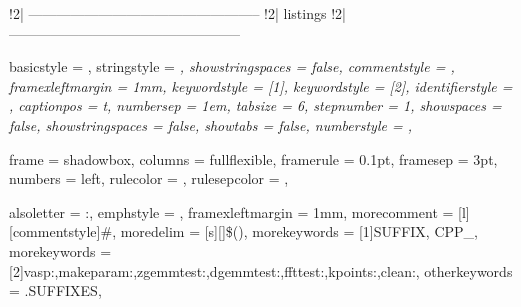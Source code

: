 !2| --------------------------------------------------
!2| {listings}
!2| --------------------------------------------------

\usepackage{listings} %

\newcommand{\mylstinputlisting}[2]{}


\newcommand{\RESERVEDCOMMANDSourceCodeIndexFontSize}{\scriptsize}

\lstset
{
	basicstyle = \RESERVEDCOMMANDSourceCodeIndexFontSize \ttfamily \color{black},
	stringstyle = \itshape\color{magenta},
	showstringspaces = false,
	commentstyle = \color{blue}\slshape,
	framexleftmargin = 1mm,
	keywordstyle = {[1]\bfseries\color{keycolor}},
	keywordstyle = {[2]\bfseries\color{mbleu}},
	identifierstyle = \color{black},
	captionpos = t, 
    numbersep = 1em, 
	tabsize	= 6,
	stepnumber = 1, 
	showspaces = false, 
    showstringspaces  = false, 
    showtabs = false, 
    numberstyle = \RESERVEDCOMMANDSourceCodeIndexFontSize, 
}

{
	frame = shadowbox,
	columns = fullflexible,
	framerule = 0.1pt,
	framesep = 3pt,
	numbers = left,
	rulecolor = \color{black},
	rulesepcolor = \color{gray!30},
}

{
    alsoletter			= {:},
    emphstyle			= {\color{vimvert}},%
    framexleftmargin	= 1mm,%
    morecomment			= [l][commentstyle]{\#},%
    moredelim			= [s][\color{vimvert}]{\$(}{)},%
    morekeywords		= [1]{SUFFIX, CPP_},
    morekeywords		= [2]{vasp:,makeparam:,zgemmtest:,dgemmtest:,ffttest:,kpoints:,clean:},
    otherkeywords		= {.SUFFIXES},
}
